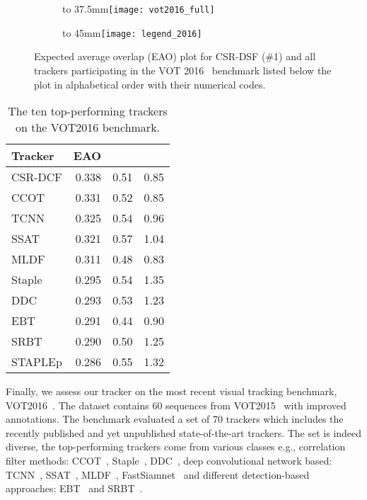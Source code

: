 \documentclass[twocolumn]{article}
\newcommand*\circledd[1]{\tikz[baseline=(char.base)]{
            \node[shape=circle,draw,inner sep=0.15pt] (char) {#1};}}
\newcommand{\first}[1]{{\raisebox{0.8pt}{\footnotesize \color{gold} \circledd{1}}\hspace{3.5pt}#1}}
\newcommand{\second}[1]{{\raisebox{0.8pt}{\footnotesize \color{silver} \circledd{2}}\hspace{3.5pt}#1}}
\newcommand{\third}[1]{{\raisebox{0.8pt}{\footnotesize \color{bronze} \circledd{3}}\hspace{3.5pt}#1}}
\newcommand{\first}[1]{\bf{\color{red}#1}}
\newcommand{\second}[1]{\em{\color{blue}#1}}
\newcommand{\third}[1]{{\color{green}#1}}
\def\imagebox#1#2{\vtop to #1{\null\hbox{#2}\vfill}}
\begin{document}
\begin{figure}[t!]
	\captionsetup[subfigure]{justification=justified,singlelinecheck=false}
    \centering
    \begin{subfigure}[t]{\linewidth}\centering
        \imagebox{37.5mm}{\texttt{[image: vot2016\_full]}}
    \end{subfigure}\vspace{\fill}
    \begin{subfigure}[t]{\linewidth}\centering
        \imagebox{45mm}{\texttt{[image: legend\_2016]}}
    \end{subfigure}
\caption{Expected average overlap (EAO) plot for CSR-DSF (\#1) and all trackers participating in the VOT 2016~\citep{kristan_vot2016} benchmark listed below the plot in alphabetical order with their numerical codes.}
    \label{fig:vot16_graph}
\end{figure}

\begin{table}[!t]\setlength{\tabcolsep}{8pt}
\begin{center}
\caption{The ten top-performing trackers on the VOT2016 benchmark.}
\label{tab:detail-vot16}
\begin{tabular*}{0.9\linewidth}{l r r r}
\hline
Tracker & EAO &  &  \\ 
\hline
CSR-DCF & \first{0.338} & 0.51 & \second{0.85} \\ 
CCOT & \second{0.331} & 0.52 & \second{0.85} \\ 
TCNN & \third{0.325} & \third{0.54} & 0.96 \\ 
SSAT & 0.321 & \first{0.57} & 1.04 \\ 
MLDF & 0.311 & 0.48 & \first{0.83} \\ 
Staple & 0.295 & \third{0.54} & 1.35 \\ 
DDC & 0.293 & 0.53 & 1.23 \\ 
EBT & 0.291 & 0.44 & \third{0.90} \\ 
SRBT & 0.290 & 0.50 & 1.25 \\ 
STAPLEp & 0.286 & \second{0.55} & 1.32 \\ 
\hline
\end{tabular*}
\end{center}
\end{table}

Finally, we assess our tracker on the most recent visual tracking benchmark, VOT2016~\citep{kristan_vot2016}. The dataset contains 60 sequences from VOT2015~\citep{kristan_vot2015} with improved annotations. The benchmark evaluated a set of 70 trackers which includes the recently published and yet unpublished state-of-the-art trackers. The set is indeed diverse, the top-performing trackers come from various classes e.g., correlation filter methods: CCOT~\citep{danelljan_eccv2016_ccot}, Staple~\citep{staple_cvpr2016}, DDC~\citep{kristan_vot2016}, deep convolutional network based: TCNN~\citep{kristan_vot2016}, SSAT~\citep{kristan_vot2016,mdnet_cvpr2016}, MLDF~\citep{kristan_vot2016,wang_iccv2015}, FastSiamnet~\citep{siamese_arxiv} and different detection-based approaches: EBT~\citep{ebt_cvpr2016} and SRBT~\citep{kristan_vot2016}.
\end{document}
